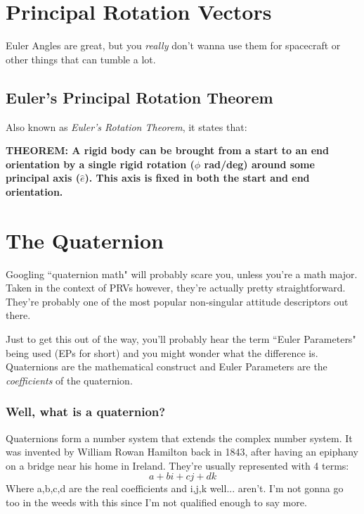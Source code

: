 \documentclass[a4paper,14pt]{extreport}
\begin{document}
\chapter{Principal Rotation Vectors}
Euler Angles are great, but you \emph{really} don't wanna use them for spacecraft or other things that can tumble a lot.
\section{Euler's Principal Rotation Theorem}
Also known as \emph{Euler's Rotation Theorem}, it states that:

\begin{center}
\textbf{THEOREM: A rigid body can be brought from a start to an end orientation by a single rigid rotation ($\phi$ rad/deg) around some principal axis ($\hat{e}$). This axis is fixed in both the start and end orientation.}
\end{center}


\chapter{The Quaternion}
Googling ``quaternion math" will probably scare you, unless you're a math major. Taken in the context of PRVs however, they're actually pretty straightforward. They're probably one of the most popular non-singular attitude descriptors out there. 

Just to get this out of the way, you'll probably hear the term ``Euler Parameters" being used (EPs for short) and you might wonder what the difference is. Quaternions are the mathematical construct and Euler Parameters are the \emph{coefficients} of the quaternion. 
 
\subsection{Well, what is a quaternion?}
Quaternions form a number system that extends the complex number system. It was invented by William Rowan Hamilton back in 1843, after having an epiphany on a bridge near his home in Ireland. They're usually represented with 4 terms:
\[
a + bi + cj + dk
\]
Where a,b,c,d are the real coefficients and i,j,k well... aren't. I'm not gonna go too in the weeds with this since I'm not qualified enough to say more.
\end{document}
